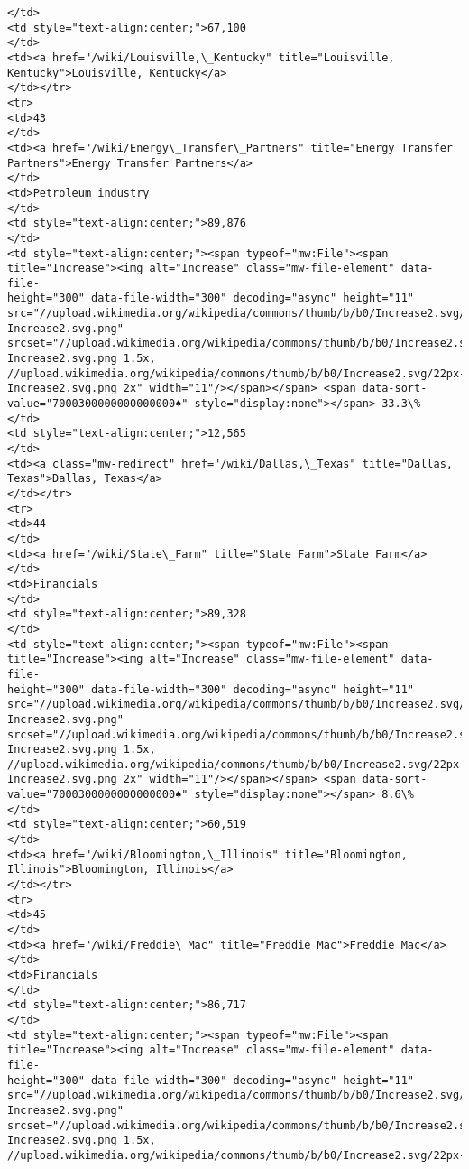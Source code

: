 \documentclass[11pt]{article}
\begin{document}
\begin{Verbatim}[commandchars=\\\{\}]
</td>
<td style="text-align:center;">67,100
</td>
<td><a href="/wiki/Louisville,\_Kentucky" title="Louisville,
Kentucky">Louisville, Kentucky</a>
</td></tr>
<tr>
<td>43
</td>
<td><a href="/wiki/Energy\_Transfer\_Partners" title="Energy Transfer
Partners">Energy Transfer Partners</a>
</td>
<td>Petroleum industry
</td>
<td style="text-align:center;">89,876
</td>
<td style="text-align:center;"><span typeof="mw:File"><span
title="Increase"><img alt="Increase" class="mw-file-element" data-file-
height="300" data-file-width="300" decoding="async" height="11"
src="//upload.wikimedia.org/wikipedia/commons/thumb/b/b0/Increase2.svg/11px-
Increase2.svg.png"
srcset="//upload.wikimedia.org/wikipedia/commons/thumb/b/b0/Increase2.svg/17px-
Increase2.svg.png 1.5x,
//upload.wikimedia.org/wikipedia/commons/thumb/b/b0/Increase2.svg/22px-
Increase2.svg.png 2x" width="11"/></span></span> <span data-sort-
value="7000300000000000000♠" style="display:none"></span> 33.3\%
</td>
<td style="text-align:center;">12,565
</td>
<td><a class="mw-redirect" href="/wiki/Dallas,\_Texas" title="Dallas,
Texas">Dallas, Texas</a>
</td></tr>
<tr>
<td>44
</td>
<td><a href="/wiki/State\_Farm" title="State Farm">State Farm</a>
</td>
<td>Financials
</td>
<td style="text-align:center;">89,328
</td>
<td style="text-align:center;"><span typeof="mw:File"><span
title="Increase"><img alt="Increase" class="mw-file-element" data-file-
height="300" data-file-width="300" decoding="async" height="11"
src="//upload.wikimedia.org/wikipedia/commons/thumb/b/b0/Increase2.svg/11px-
Increase2.svg.png"
srcset="//upload.wikimedia.org/wikipedia/commons/thumb/b/b0/Increase2.svg/17px-
Increase2.svg.png 1.5x,
//upload.wikimedia.org/wikipedia/commons/thumb/b/b0/Increase2.svg/22px-
Increase2.svg.png 2x" width="11"/></span></span> <span data-sort-
value="7000300000000000000♠" style="display:none"></span> 8.6\%
</td>
<td style="text-align:center;">60,519
</td>
<td><a href="/wiki/Bloomington,\_Illinois" title="Bloomington,
Illinois">Bloomington, Illinois</a>
</td></tr>
<tr>
<td>45
</td>
<td><a href="/wiki/Freddie\_Mac" title="Freddie Mac">Freddie Mac</a>
</td>
<td>Financials
</td>
<td style="text-align:center;">86,717
</td>
<td style="text-align:center;"><span typeof="mw:File"><span
title="Increase"><img alt="Increase" class="mw-file-element" data-file-
height="300" data-file-width="300" decoding="async" height="11"
src="//upload.wikimedia.org/wikipedia/commons/thumb/b/b0/Increase2.svg/11px-
Increase2.svg.png"
srcset="//upload.wikimedia.org/wikipedia/commons/thumb/b/b0/Increase2.svg/17px-
Increase2.svg.png 1.5x,
//upload.wikimedia.org/wikipedia/commons/thumb/b/b0/Increase2.svg/22px-

\end{Verbatim}
\end{document}
